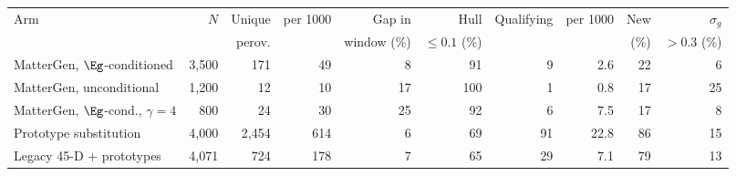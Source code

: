 \begin{tabular}{@{}lrrrrrrrrr@{}}\toprule
 Arm & $N$ & Unique & per 1000 & Gap in & Hull & Qualifying & per 1000 & New & $\sigma_g$\\
 & & perov. & & window (\%) & $\le0.1$ (\%) & & & (\%) & $>0.3$ (\%)\\\midrule
MatterGen, $\Eg$-conditioned & 3{,}500 & 171 & 49 & 8 & 91 & 9 & 2.6 & 22 & 6 \\
MatterGen, unconditional & 1{,}200 & 12 & 10 & 17 & 100 & 1 & 0.8 & 17 & 25 \\
MatterGen, $\Eg$-cond., $\gamma{=}4$ & 800 & 24 & 30 & 25 & 92 & 6 & 7.5 & 17 & 8 \\
Prototype substitution & 4{,}000 & 2{,}454 & 614 & 6 & 69 & 91 & 22.8 & 86 & 15 \\
Legacy 45-D + prototypes & 4{,}071 & 724 & 178 & 7 & 65 & 29 & 7.1 & 79 & 13 \\
\bottomrule\end{tabular}
